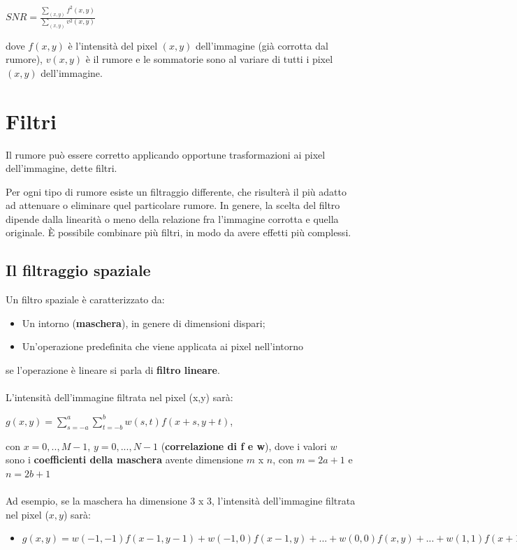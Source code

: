 \begin{center}
    $
        SNR = \frac{\sum_{(x,y)}^{}f^2(x,y)}{\sum_{(x,y)}^{}v^2(x,y)}
    $
\end{center}

dove $f(x, y)$ è l'intensità del pixel $(x, y)$ dell'immagine (già corrotta dal rumore), $v(x, y)$ è il rumore e le sommatorie sono al
variare di tutti i pixel $(x, y)$ dell'immagine.

\section{Filtri}

\begin{definition}
    Il rumore può essere corretto applicando opportune trasformazioni ai pixel dell'immagine, dette filtri.
\end{definition}
Per ogni tipo di rumore esiste un filtraggio differente, che risulterà il più
adatto ad attenuare o eliminare quel particolare rumore. In genere, la scelta
del filtro dipende dalla linearità o meno della relazione fra l'immagine
corrotta e quella originale. È possibile combinare più filtri, in modo da avere
effetti più complessi.

\subsection{Il filtraggio spaziale}

Un filtro spaziale è caratterizzato da:

\begin{itemize}
    \item Un intorno (\textbf{maschera}), in genere di dimensioni dispari;
    \item Un'operazione predefinita che viene applicata ai pixel nell'intorno
\end{itemize}
se l'operazione è lineare si parla di \textbf{filtro lineare}.
\\\\
L'intensità dell'immagine filtrata nel pixel (x,y) sarà:

\begin{center}
    $g(x,y) = \sum_{s=-a}^{a}\sum_{t=-b}^{b}w(s,t)f(x+s,y+t)$,
\end{center}

con $x=0,..,M-1$, $y=0,...,N-1$ (\textbf{correlazione di f e w}), dove i valori $w$ sono i \textbf{coefficienti della maschera}
avente dimensione $m$ x $n$, con $m = 2a+1$ e $n = 2b+1$
\\\\
Ad esempio, se la maschera ha dimensione 3 x 3, l'intensità dell'immagine filtrata nel pixel ($x,y$) sarà:
\begin{itemize}
    \item $g(x,y)=w(-1,-1)f(x-1,y-1)+w(-1,0)f(x-1,y)+...+w(0,0)f(x,y)+...+w(1,1)f(x+1,y+1)$
\end{itemize}

